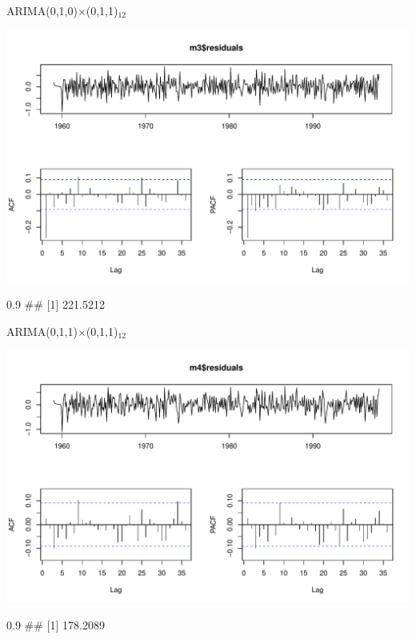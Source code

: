 \documentclass[11pt,ignorenonframetext,]{beamer}
\let\oldverbatim\verbatim
\let\endoldverbatim\endverbatim
\renewenvironment{verbatim}{\footnotesize\begin{spacing}{0.9}\oldverbatim}{\endoldverbatim\end{spacing}}
\begin{document}
\begin{frame}[fragile]{ARIMA(0,1,0)\(\times\)(0,1,1)\(_{12}\)}

\includegraphics{Lec15_files/figure-beamer/unnamed-chunk-5-1.pdf}

\begin{verbatim}
## [1] 221.5212
\end{verbatim}

\end{frame}

\begin{frame}[fragile]{ARIMA(0,1,1)\(\times\)(0,1,1)\(_{12}\)}

\includegraphics{Lec15_files/figure-beamer/unnamed-chunk-6-1.pdf}

\begin{verbatim}
## [1] 178.2089
\end{verbatim}

\end{frame}
\end{document}
